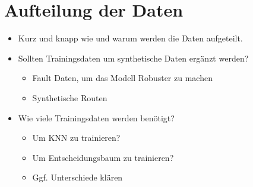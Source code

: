 \section{Aufteilung der Daten}
\begin{itemize}
    \item Kurz und knapp wie und warum werden die Daten aufgeteilt.
    \item Sollten Trainingsdaten um synthetische Daten ergänzt werden?
    \begin{itemize}
        \item Fault Daten, um das Modell Robuster zu machen
        \item Synthetische Routen
    \end{itemize}
    \item Wie viele Trainingsdaten werden benötigt?
    \begin{itemize}
        \item Um KNN zu trainieren?
        \item Um Entscheidungsbaum zu trainieren?
        \item Ggf. Unterschiede klären
    \end{itemize}
\end{itemize}